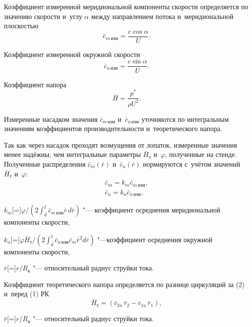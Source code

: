 Коэффициент измеренной меридиональной компоненты скорости определяется по значению скорости и~углу \(\alpha\) между направлением потока и~меридиональной плоскостью
\begin{equation}
	\bar{c}_{m \, \text{изм}} =\frac{c \cos{\alpha}}{U}.
\end{equation}

Коэффициент измеренной окружной скорости
\begin{equation}
	\bar{c}_{u \, \text{изм}}=\frac{c \sin{\alpha}}{U}.
\end{equation}

Коэффициент напора
\begin{equation}
	\bar{H}=\frac{p^{*}}{\rho U^2}.
\end{equation}

Измеренные насадком значения \(\bar{c}_{m \,\text{изм}}\) и~\(\bar{c}_{u \,\text{изм}}\) уточняются по интегральным значениям коэффициентов производительности и~теоретического напора.

Так как через насадок проходят возмущения от лопаток, измеренные значения менее надёжны, чем интегральные параметры \(\bar{H}_\text{т}\) и~\(\varphi\), полученные на стенде.
Полученные распределения \(\bar{c}_{m}(\bar{r})\) и~\(\bar{c}_{u}(\bar{r})\) нормируются с~учётом значений \(\bar{H}_\text{т}\) и~\(\varphi\):
\begin{gather}
	\bar{c}_m = k_m \bar{c}_{m \, \text{изм}}, \\
	\bar{c}_u = k_u \bar{c}_{u \, \text{изм}},
\end{gather}
\begin{eqexpl}
	\item{\(k_m\)}[=]\(\varphi/(2 \int_{\bar{d}}^{1} \bar{c}_{m \, \text{изм}} \bar{r} \, d\bar{r})\) "--- коэффициент осреднения меридиональной компоненты скорости,

	\item{\(k_u\)}[=]\(\varphi \bar{H}_\text{т}/(2 \int_{\bar{d}}^{1} \bar{c}_{u \, \text{изм}} \bar{c}_m \bar{r}^2 d\bar{r})\) "---коэффициент осреднения окружной компоненты скорости,

	\item{\(\bar{r}\)}[=]\(r/R_\text{к}\) "--- относительный радиус струйки тока.
\end{eqexpl}

Коэффициент теоретического напора определяется по разнице циркуляций за (2) и~перед (1) РК
\begin{equation}
	\bar{H}_\text{т} = (\bar{c}_{2u} \, \bar{r}_2 - \bar{c}_{1u} \, \bar{r}_1),
\end{equation}
\begin{eqexpl}
	\item{\(\bar{r}\)}[=]\(r/R_\text{к}\) "--- относительный радиус струйки тока.
 \end{eqexpl}

